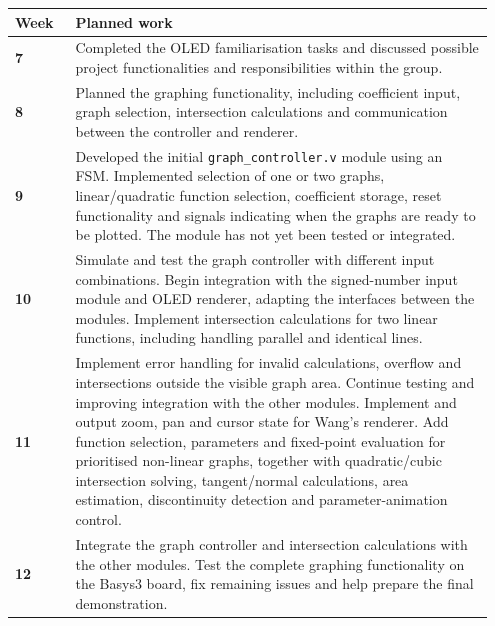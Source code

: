 \documentclass[10pt,a4paper]{article}
\makeatletter
\newenvironment{timeline}{%
  \vspace{2pt}%
  \begin{tabular}{@{}>{\bfseries}p{0.12\linewidth}p{0.83\linewidth}@{}}%
  \hline
  Week & \textbf{Planned work}\\
  \hline
}{%
  \hline
  \end{tabular}%
  \vspace{2pt}%
}
\newcommand{\wk}[2]{#1 & #2\\}
\makeatother
\begin{document}
\begin{timeline}
\wk{7}{Completed the OLED familiarisation tasks and discussed possible project
functionalities and responsibilities within the group.}

\wk{8}{Planned the graphing functionality, including coefficient input, graph
selection, intersection calculations and communication between the controller
and renderer.}

\wk{9}{Developed the initial \texttt{graph\_controller.v} module using an FSM.
Implemented selection of one or two graphs, linear/quadratic function selection,
coefficient storage, reset functionality and signals indicating when the graphs
are ready to be plotted. The module has not yet been tested or integrated.}

\wk{10}{Simulate and test the graph controller with different input
combinations. Begin integration with the signed-number input module and OLED
renderer, adapting the interfaces between the modules. Implement intersection
calculations for two linear functions, including handling parallel and
identical lines.}

\wk{11}{Implement error handling for invalid calculations, overflow and
intersections outside the visible graph area. Continue testing and improving
integration with the other modules. Implement and output zoom, pan and cursor
state for Wang's renderer. Add function selection, parameters and fixed-point
evaluation for prioritised non-linear graphs, together with quadratic/cubic
intersection solving, tangent/normal calculations, area estimation,
discontinuity detection and parameter-animation control.}

\wk{12}{Integrate the graph controller and intersection calculations with the
other modules. Test the complete graphing functionality on the Basys3 board,
fix remaining issues and help prepare the final demonstration.}
\end{timeline}
\end{document}
